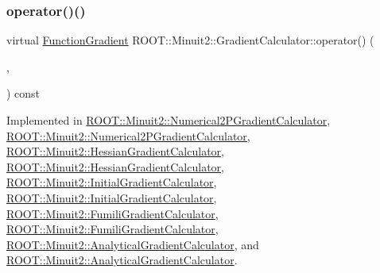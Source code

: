 \mbox{\label{classROOT_1_1Minuit2_1_1GradientCalculator_a1809c1e8a89d32aabf7835e9690c2916}} 
\subsubsection{\texorpdfstring{operator()()}{operator()()}\hspace{0.1cm}{\footnotesize\ttfamily [3/4]}}
{\footnotesize\ttfamily virtual \mbox{\hyperlink{classROOT_1_1Minuit2_1_1FunctionGradient}{Function\+Gradient}} R\+O\+O\+T\+::\+Minuit2\+::\+Gradient\+Calculator\+::operator() (\begin{DoxyParamCaption}\item[{const \mbox{\hyperlink{classROOT_1_1Minuit2_1_1MinimumParameters}{Minimum\+Parameters}} \&}]{,  }\item[{const \mbox{\hyperlink{classROOT_1_1Minuit2_1_1FunctionGradient}{Function\+Gradient}} \&}]{ }\end{DoxyParamCaption}) const\hspace{0.3cm}{\ttfamily [pure virtual]}}



Implemented in \mbox{\hyperlink{classROOT_1_1Minuit2_1_1Numerical2PGradientCalculator_a89c825ba34455277290940fa62fc5321}{R\+O\+O\+T\+::\+Minuit2\+::\+Numerical2\+P\+Gradient\+Calculator}}, \mbox{\hyperlink{classROOT_1_1Minuit2_1_1Numerical2PGradientCalculator_a9ca27ef0f61a678b528f32a002e8002b}{R\+O\+O\+T\+::\+Minuit2\+::\+Numerical2\+P\+Gradient\+Calculator}}, \mbox{\hyperlink{classROOT_1_1Minuit2_1_1HessianGradientCalculator_ae8832c265494484c65aed77f023b843f}{R\+O\+O\+T\+::\+Minuit2\+::\+Hessian\+Gradient\+Calculator}}, \mbox{\hyperlink{classROOT_1_1Minuit2_1_1HessianGradientCalculator_af6fed0f29a33ec23f97451562d41cfaa}{R\+O\+O\+T\+::\+Minuit2\+::\+Hessian\+Gradient\+Calculator}}, \mbox{\hyperlink{classROOT_1_1Minuit2_1_1InitialGradientCalculator_aca07af1a7ff9e8525c0d4d2d3633f9c5}{R\+O\+O\+T\+::\+Minuit2\+::\+Initial\+Gradient\+Calculator}}, \mbox{\hyperlink{classROOT_1_1Minuit2_1_1InitialGradientCalculator_a673e891a98df0e4a4f71442ab61084bb}{R\+O\+O\+T\+::\+Minuit2\+::\+Initial\+Gradient\+Calculator}}, \mbox{\hyperlink{classROOT_1_1Minuit2_1_1FumiliGradientCalculator_a652f65091b404ebda9a645d7ba92b3b6}{R\+O\+O\+T\+::\+Minuit2\+::\+Fumili\+Gradient\+Calculator}}, \mbox{\hyperlink{classROOT_1_1Minuit2_1_1FumiliGradientCalculator_a652f65091b404ebda9a645d7ba92b3b6}{R\+O\+O\+T\+::\+Minuit2\+::\+Fumili\+Gradient\+Calculator}}, \mbox{\hyperlink{classROOT_1_1Minuit2_1_1AnalyticalGradientCalculator_ad16442d24717c36e7d32897a2f8951c0}{R\+O\+O\+T\+::\+Minuit2\+::\+Analytical\+Gradient\+Calculator}}, and \mbox{\hyperlink{classROOT_1_1Minuit2_1_1AnalyticalGradientCalculator_a4048ce1c6e9b120f5cb808f090a90030}{R\+O\+O\+T\+::\+Minuit2\+::\+Analytical\+Gradient\+Calculator}}.

